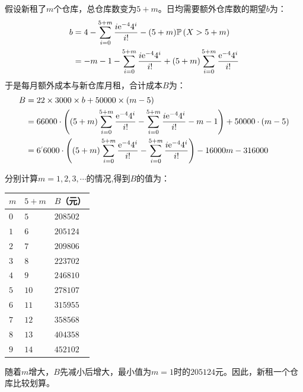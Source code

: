 \documentclass[12pt,UTF8]{ctexbook}
\begin{document}
\begin{so}
    假设新租了$m$个仓库，总仓库数变为$5+m$。日均需要额外仓库数的期望$b$为：
    \begin{align*}
        b &= 4 - \sum_{i=0}^{5+m} \frac{i\mathrm{e}^{-4}4^i}{i!} - (5+m) \mathbb{P}\left(X>5+m\right) \\
        &= -m - 1 - \sum_{i=0}^{5+m} \frac{i\mathrm{e}^{-4}4^i}{i!} + (5+m) \sum_{i=0}^{5+m} \frac{\mathrm{e}^{-4}4^i}{i!}
    \end{align*}
    于是每月额外成本与新仓库月租，合计成本$B$为：
    \begin{align*}
        B =\; & 22 \times 3000 \times b + 50000 \times (m - 5) \\
        =\;& 66000\cdot \left( (5+m) \sum_{i=0}^{5+m} \frac{\e^{-4}4^i}{i!} - \sum_{i=0}^{5+m} \frac{i\e^{-4}4^i}{i!}  -m - 1\right) + 50000 \cdot (m - 5) \\
        =\;& 6\dlim{6000}\cdot \left((5+m) \sum_{i=0}^{5+m} \frac{\e^{-4}4^i}{i!} - \sum_{i=0}^{5+m} \frac{i\e^{-4}4^i}{i!}\right) -16000 m - 316000 
    \end{align*}
    
    分别计算$m=1,2,3,\cdots$的情况,得到$B$的值为：
    \begin{center}
        \begin{tabular}{  | p{3em}<{\centering} | p{6em}<{\centering} | p{6em}<{\centering} | }
            \hline
            $m$ & $5+m$ & $B$（元） \\
            \hline
            $0$ & $5$ & $208502$\\
            \hline 
            $1$ & $6$ & $205124$ \\
            \hline 
            $2$ & $7$ & $209806$\\
            \hline 
            $3$ & $8$ & $223702$ \\
            \hline 
            $4$ & $9$ & $246810$ \\
            \hline 
            $5$ & $10$ & $278107$ \\
            \hline 
            $6$ & $11$ & $315955$ \\
            \hline 
            $7$ & $12$ & $358568$ \\
            \hline 
            $8$ & $13$ & $404358$ \\
            \hline
            $9$ & $14$ & $452102$ \\
            \hline
        \end{tabular}
    \end{center}
    随着$m$增大，$B$先减小后增大，最小值为$m=1$时的$205124$元。因此，新租一个仓库比较划算。
\end{so}
\end{document}

